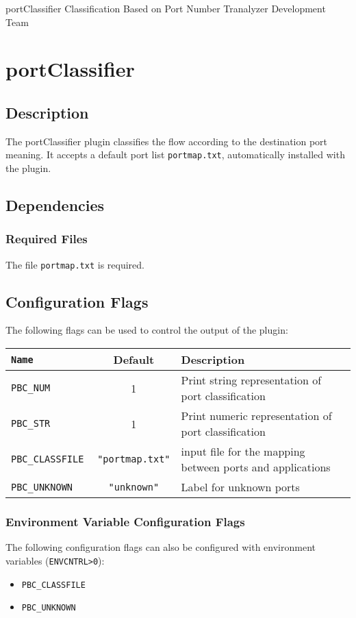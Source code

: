 \documentclass[documentation]{subfiles}
\begin{document}
\trantitle
    {portClassifier}
    {Classification Based on Port Number}
    {Tranalyzer Development Team} %

\section{portClassifier}\label{s:portClassifier}

\subsection{Description}
The portClassifier plugin classifies the flow according to the destination port meaning. It accepts a default port list {\tt portmap.txt}, automatically installed with the plugin.

\subsection{Dependencies}

\subsubsection{Required Files}
The file {\tt portmap.txt} is required.

\subsection{Configuration Flags}
The following flags can be used to control the output of the plugin:
\begin{longtable}{>{\tt}lcl}
    \toprule
    {\bf Name} & {\bf Default} & {\bf Description} \\
    \midrule\endhead%
    PBC\_NUM       &  1 & Print string representation of port classification\\
    PBC\_STR       &  1 & Print numeric representation of port classification\\
    PBC\_CLASSFILE & {\tt\small "portmap.txt"}
                        & input file for the mapping between ports and applications\\
    PBC\_UNKNOWN   & {\tt\small "unknown"}
                        & Label for unknown ports\\
    \bottomrule
\end{longtable}

\subsubsection{Environment Variable Configuration Flags}
The following configuration flags can also be configured with environment variables ({\tt ENVCNTRL>0}):
\begin{itemize}
    \item {\tt PBC\_CLASSFILE}
    \item {\tt PBC\_UNKNOWN}
\end{itemize}
\end{document}
